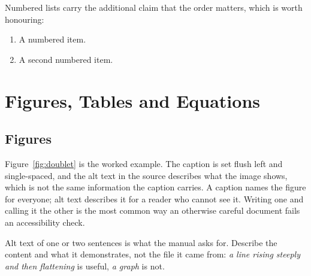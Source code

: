 Numbered lists carry the additional claim that the order matters, which is
worth honouring:

\begin{enumerate}
  \item A numbered item.
  \item A second numbered item.
\end{enumerate}

\section{Figures, Tables and Equations}
\subsection{Figures}

%
Figure~\ref{fig:doublet} is the worked example. The caption is set flush left
and single-spaced, and the alt text in the source describes what the image
shows, which is not the same information the caption carries. A caption names
the figure for everyone; alt text describes it for a reader who cannot see it.
Writing one and calling it the other is the most common way an otherwise
careful document fails an accessibility check.

Alt text of one or two sentences is what the manual asks for. Describe the
content and what it demonstrates, not the file it came from: \emph{a line
rising steeply and then flattening} is useful, \emph{a graph} is not.

